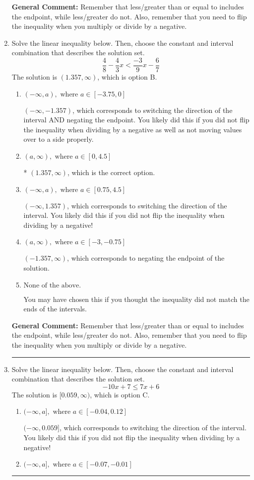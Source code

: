 \documentclass{extbook}[14pt]
\newcommand{\litem}[1]{\item #1

\rule{\textwidth}{0.4pt}}
\begin{document}
\begin{enumerate}
{\textbf{General Comment:} Remember that less/greater than or equal to includes the endpoint, while less/greater do not. Also, remember that you need to flip the inequality when you multiply or divide by a negative.
}
\litem{
Solve the linear inequality below. Then, choose the constant and interval combination that describes the solution set.
\[ \frac{4}{8} - \frac{4}{3} x < \frac{-3}{9} x - \frac{6}{7} \]The solution is \( (1.357, \infty) \), which is option B.\begin{enumerate}[label=\Alph*.]
\item \( (-\infty, a), \text{ where } a \in [-3.75, 0] \)

 $(-\infty, -1.357)$, which corresponds to switching the direction of the interval AND negating the endpoint. You likely did this if you did not flip the inequality when dividing by a negative as well as not moving values over to a side properly.
\item \( (a, \infty), \text{ where } a \in [0, 4.5] \)

* $(1.357, \infty)$, which is the correct option.
\item \( (-\infty, a), \text{ where } a \in [0.75, 4.5] \)

 $(-\infty, 1.357)$, which corresponds to switching the direction of the interval. You likely did this if you did not flip the inequality when dividing by a negative!
\item \( (a, \infty), \text{ where } a \in [-3, -0.75] \)

 $(-1.357, \infty)$, which corresponds to negating the endpoint of the solution.
\item \( \text{None of the above}. \)

You may have chosen this if you thought the inequality did not match the ends of the intervals.
\end{enumerate}

\textbf{General Comment:} Remember that less/greater than or equal to includes the endpoint, while less/greater do not. Also, remember that you need to flip the inequality when you multiply or divide by a negative.
}
\litem{
Solve the linear inequality below. Then, choose the constant and interval combination that describes the solution set.
\[ -10x + 7 \leq 7x + 6 \]The solution is \( [0.059, \infty) \), which is option C.\begin{enumerate}[label=\Alph*.]
\item \( (-\infty, a], \text{ where } a \in [-0.04, 0.12] \)

 $(-\infty, 0.059]$, which corresponds to switching the direction of the interval. You likely did this if you did not flip the inequality when dividing by a negative!
\item \( (-\infty, a], \text{ where } a \in [-0.07, -0.01] \)


\end{enumerate}}
\end{enumerate}
\end{document}
